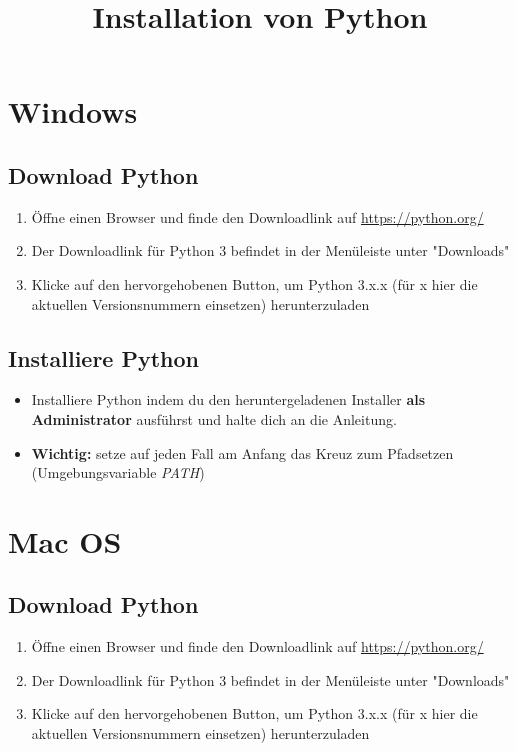 \documentclass[accentcolor=3c,colorbacktitle,12pt]{tudaexercise}
\title{Installation von Python}
\begin{document}
\maketitle



\section*{Windows}
\subsection*{Download Python}
\begin{enumerate}
	\item Öffne einen Browser und finde den Downloadlink auf \url{https://python.org/}
	\item Der Downloadlink für Python 3 befindet in der Menüleiste unter "Downloads"
	\item Klicke auf den hervorgehobenen Button, um Python 3.x.x (für x hier die aktuellen Versionsnummern einsetzen) herunterzuladen
\end{enumerate}
\subsection*{Installiere Python}
\begin{itemize}
	\item Installiere Python indem du den heruntergeladenen Installer \textbf{als Administrator} ausführst und halte dich an die Anleitung. 
	\item \textbf{Wichtig:} setze auf jeden Fall am Anfang das Kreuz zum Pfadsetzen (Umgebungsvariable \emph{PATH})
\end{itemize}

\section*{Mac OS}
\subsection*{Download Python}
\begin{enumerate}
	\item Öffne einen Browser und finde den Downloadlink auf \url{https://python.org/}
	\item Der Downloadlink für Python 3 befindet in der Menüleiste unter "Downloads"
	\item Klicke auf den hervorgehobenen Button, um Python 3.x.x (für x hier die aktuellen Versionsnummern einsetzen) herunterzuladen
\end{enumerate}
\end{document}
